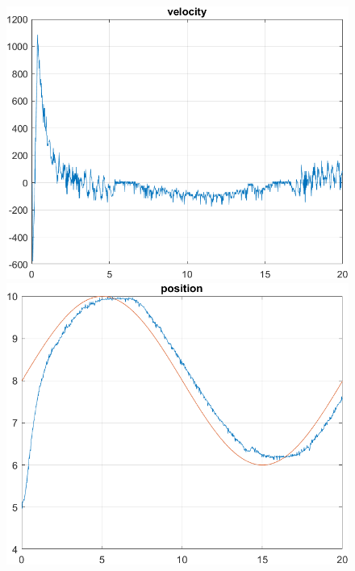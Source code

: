 \begin{enumerate}
    \begin{figure}[H]
    \centering
    \begin{minipage}{0.44\textwidth}
        \includegraphics[width=\linewidth]{Images/lab2/4/3/vel2243.png}
    \end{minipage}
    \hfill
    \begin{minipage}{0.44\textwidth}
        \includegraphics[width=\linewidth]{Images/lab2/4/3/pos2243.png}
    \end{minipage}
    

\end{figure}
\end{enumerate}
